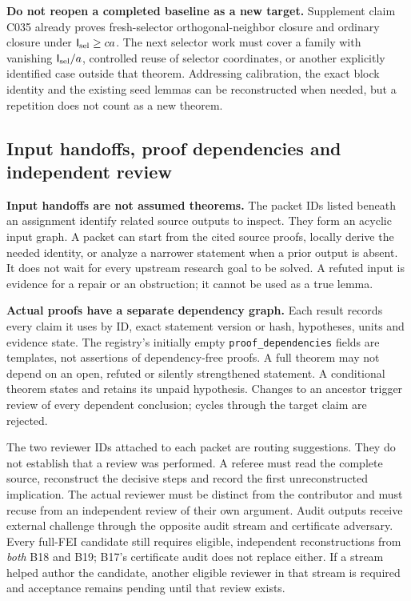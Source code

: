 \documentclass[11pt]{article}
\begin{document}
\textbf{Do not reopen a completed baseline as a new target.} Supplement claim C035 already proves fresh-selector orthogonal-neighbor closure and ordinary closure under $\mathsf I_{\rm sel}\ge ca$. The next selector work must cover a family with vanishing $\mathsf I_{\rm sel}/a$, controlled reuse of selector coordinates, or another explicitly identified case outside that theorem. Addressing calibration, the exact block identity and the existing seed lemmas can be reconstructed when needed, but a repetition does not count as a new theorem.

\subsection{Input handoffs, proof dependencies and independent review}

\textbf{Input handoffs are not assumed theorems.} The packet IDs listed beneath an assignment identify related source outputs to inspect. They form an acyclic input graph. A packet can start from the cited source proofs, locally derive the needed identity, or analyze a narrower statement when a prior output is absent. It does not wait for every upstream research goal to be solved. A refuted input is evidence for a repair or an obstruction; it cannot be used as a true lemma.

\textbf{Actual proofs have a separate dependency graph.} Each result records every claim it uses by ID, exact statement version or hash, hypotheses, units and evidence state. The registry's initially empty \texttt{proof\_dependencies} fields are templates, not assertions of dependency-free proofs. A full theorem may not depend on an open, refuted or silently strengthened statement. A conditional theorem states and retains its unpaid hypothesis. Changes to an ancestor trigger review of every dependent conclusion; cycles through the target claim are rejected.

The two reviewer IDs attached to each packet are routing suggestions. They do not establish that a review was performed. A referee must read the complete source, reconstruct the decisive steps and record the first unreconstructed implication. The actual reviewer must be distinct from the contributor and must recuse from an independent review of their own argument. Audit outputs receive external challenge through the opposite audit stream and certificate adversary. Every full-FEI candidate still requires eligible, independent reconstructions from \emph{both} B18 and B19; B17's certificate audit does not replace either. If a stream helped author the candidate, another eligible reviewer in that stream is required and acceptance remains pending until that review exists.
\end{document}
